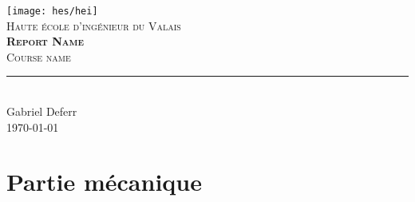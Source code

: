 \documentclass[11pt,titlepage]{report}
\begin{document}
\begin{titlepage}
	\centering
    \texttt{[image: hes/hei]}\\[1cm] 	%
    \textsc{\LARGE Haute école d'ingénieur du Valais}\\ \vspace{\fill}
    \textbf{\textsc{\fontsize{35}{35}\selectfont Report Name}}\\ \vspace{\fill}
	\textsc{\LARGE Course name}\\[0.4cm]
	\rule{\linewidth}{0.2 mm} \\[0.5 cm]
	Gabriel Deferr \\
	\today
\end{titlepage}
\restoregeometry

\tableofcontents

\chapter{Partie mécanique}

\end{document}
